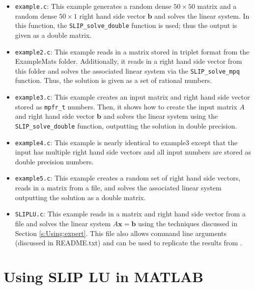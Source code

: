 \documentclass[12pt]{article}
\theoremstyle{definition}
\begin{document}
\begin{itemize}
\item \verb|example.c|: This example generates a random dense $50 \times 50$
matrix and a random dense $50 \times 1$ right hand side vector $\mathbf{b}$ and
solves the linear system. In this function, the \verb|SLIP_solve_double|
function is used; thus the output is given as a double matrix.

\item \verb|example2.c|: This example reads in a matrix stored in triplet
format from the ExampleMats folder. Additionally, it reads in a
right hand side vector from this folder and solves the associated linear system
via the \verb|SLIP_solve_mpq| function. Thus, the solution is given as a set of
rational numbers.

\item \verb|example3.c|: This example creates an input matrix and right hand
side vector stored as \verb|mpfr_t| numbers. Then, it shows how to create the
input matrix $A$ and right hand side vector $\mathbf{b}$ and solves the linear
system using the \verb|SLIP_solve_double| function, outputting the solution in
double precision.

\item \verb|example4.c|: This example is nearly identical to example3 except
that the input has multiple right hand side vectors and all input numbers are
stored as double precision numbers.

\item \verb|example5.c|: This example creates a random set of right hand side
vectors, reads in a matrix from a file, and solves the associated linear system
outputting the solution as a double matrix.

\item \verb|SLIPLU.c|: This example reads in a matrix and right hand side
vector from a file and solves the linear system $A \mathbf{x} = \mathbf{b}$
using the techniques discussed in Section \ref{s:Using:expert}. This file also
allows command line arguments (discussed in README.txt) and can be used to
replicate the results from \cite{lourenco2019exact}.

\end{itemize}

\cprotect\section{Using SLIP LU in MATLAB}
\label{s:Use:MATLAB}
\end{document}
